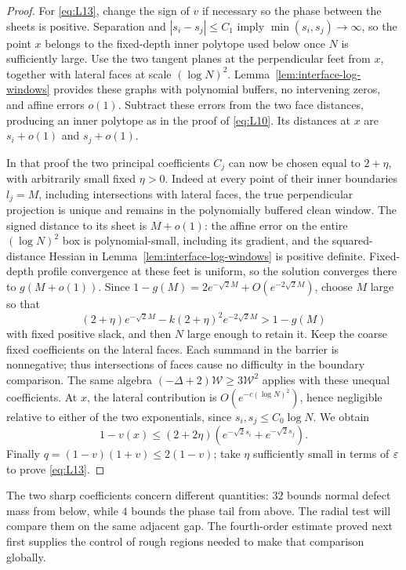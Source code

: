 \begin{proof}
For \eqref{eq:L13}, change the sign of $v$ if necessary so the
phase between the sheets is positive.  Separation and
$|s_i-s_j|\le C_1$ imply $\min(s_i,s_j)\to\infty$, so the point
$x$ belongs to the fixed-depth inner polytope used below once $N$
is sufficiently large.  Use the two tangent planes
at the perpendicular feet from $x$, together with lateral faces
at scale $(\log N)^2$.  Lemma~\ref{lem:interface-log-windows}
provides these graphs with polynomial buffers, no intervening
zeros, and affine errors $o(1)$.  Subtract these errors from the
two face distances, producing an inner polytope as in the proof
of \eqref{eq:L10}.  Its distances at $x$ are $s_i+o(1)$ and
$s_j+o(1)$.

In that proof the two principal coefficients $C_j$ can now be
chosen equal to $2+\eta$, with arbitrarily small fixed $\eta>0$.
Indeed at every point of their inner boundaries $l_j=M$, including
intersections with lateral faces, the true perpendicular projection
is unique and remains in the polynomially buffered clean window.
The signed distance to its sheet is $M+o(1)$: the affine error on
the entire $(\log N)^2$ box is polynomial-small, including its
gradient, and the squared-distance Hessian in
Lemma~\ref{lem:interface-log-windows} is positive definite.
Fixed-depth profile convergence at these feet is uniform, so the
solution converges there to $g(M+o(1))$.  Since
$1-g(M)=2e^{-\sqrt2M}+O(e^{-2\sqrt2M})$, choose $M$ large
so that
\[
 (2+\eta)e^{-\sqrt2M}
       -k(2+\eta)^2e^{-2\sqrt2M}>1-g(M)
\]
with fixed positive slack, and then $N$ large enough to retain it.
Keep the coarse fixed coefficients on the lateral faces.  Each
summand in the barrier is nonnegative; thus intersections of faces
cause no difficulty in the boundary comparison.  The same algebra
$(-\Delta+2)\mathcal W\ge3\mathcal W^2$ applies with these unequal
coefficients.  At $x$, the lateral contribution is
$O(e^{-c(\log N)^2})$, hence negligible relative to either of the
two exponentials, since $s_i,s_j\le C_0\log N$.
We obtain
\[
 1-v(x)\le(2+2\eta)
       \left(e^{-\sqrt2s_i}+e^{-\sqrt2s_j}\right).
\]
Finally $q=(1-v)(1+v)\le2(1-v)$; take $\eta$ sufficiently small
in terms of $\varepsilon$ to prove \eqref{eq:L13}.
\end{proof}


The two sharp coefficients concern different quantities: $32$ bounds
normal defect mass from below, while $4$ bounds the phase tail from
above.  The radial test will compare them on the same adjacent gap.
The fourth-order estimate proved next first supplies the control of
rough regions needed to make that comparison globally.
